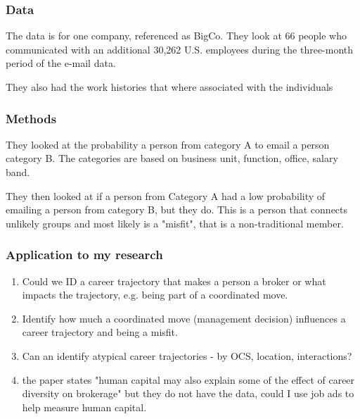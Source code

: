 \documentclass[12pt]{article}
\begin{document}
\subsubsection*{Data}

The data is for one company, referenced as BigCo. They look at 66 people who communicated with an additional 30,262 U.S. employees during the three-month period of the e-mail data.

They also had the work histories that where associated with the individuals

\subsubsection*{Methods}

They looked at the probability a person from category A to email a person category B. The categories are based on business unit, function, office, salary band.

They then looked at if a person from Category A had a low probability of emailing a person from category B, but they do. This is a person that connects unlikely groups and most likely is a "misfit", that is a non-traditional member.

\subsubsection*{Application to my research}

\begin{enumerate}
    \item Could we ID a career trajectory that makes a person a broker or what impacts the trajectory, e.g. being part of a coordinated move.
    \item Identify how much a coordinated move (management decision) influences a career trajectory and being a misfit.
    \item Can an identify atypical career trajectories - by OCS, location, interactions?
    \item the paper states "human capital may also explain some of the effect of career diversity on brokerage" but they do not have the data, could I use job ads to help measure human capital.
\end{enumerate}




\end{document}
